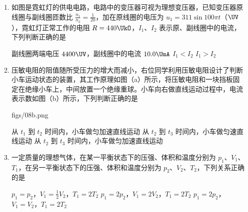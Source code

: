 \documentclass[\gkver]{gaokaozhenti}
\begin{document}
\begin{enumerate}
\item
如图是霓虹灯的供电电路，电路中的变压器可视为理想变压器，已知变压器原线圈与副线圈匝数比 $\frac{n_{1}}{n_{2}}=\frac{1}{20}$，加在原线圈的电压为 $u_{1}=311\sin100\pi t$（$\UV$），霓虹灯正常工作的电阻 $R=440\UkO$，$I_{1}$、$I_{2}$ 表示原、副线圈中的电流，下列判断正确的是


{副线圈两端电压 $4400\UV$，副线圈中的电流 $10.0\UmA$}
{$I_{1}<I_{2}$}
{$I_{1}>I_{2}$}


\item
压敏电阻的阻值随所受压力的增大而减小，右位同学利用压敏电阻设计了判断小车运动状态的装置，其工作原理如图（a）所示，将压敏电阻和一块挡板固定在绝缘小车上，中间放置一个绝缘重球。小车向右做直线运动过程中，电流表示数如图（b）所示，下列判断正确的是

{figs/08b.png}

{从 $t_{1}$ 到 $t_{2}$ 时间内，小车做匀加速直线运动}
{从 $t_{2}$ 到 $t_{3}$ 时间内，小车做匀速直线运动}
{从 $t_{2}$ 到 $t_{3}$ 时间内，小车做匀加速直线运动}


\item
一定质量的理想气体，在某一平衡状态下的压强、体积和温度分别为 $p_{1}$、$V_{1}$、$T_{1}$，在另一平衡状态下的压强、体积和温度分别为 $p_{2}$、$V_{2}$、$T_{2}$，下列关系正确的是

{$p_{1}=p_{2}$，$V_{1}=\frac{1}{2}V_{2}$，$T_{1}=2T_{2}$}
{$p_{1}=2p_{2}$，$V_{1}=2V_{2}$，$T_{1}=2T_{2}$}
{$p_{1}=2p_{2}$，$V_{1}=V_{2}$，$T_{1}=2T_{2}$}


\end{enumerate}
\end{document}
